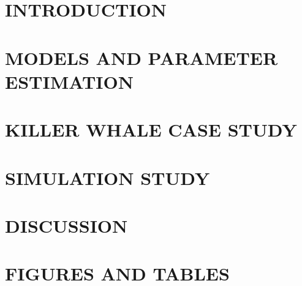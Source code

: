 \documentclass[12pt]{TD-CJS}
\begin{document}
%
\section{INTRODUCTION}

%
\section{MODELS AND PARAMETER ESTIMATION}
\label{sec:models}

%
\section{KILLER WHALE CASE STUDY}
\label{sec:data}

%
\section{SIMULATION STUDY}
\label{sec:sim_study}

%
\section{DISCUSSION}

%
%
\newpage

%
\newpage
\begin{appendix}
%

\end{appendix}
%
\newpage
\section{FIGURES AND TABLES}

%
\end{document}
